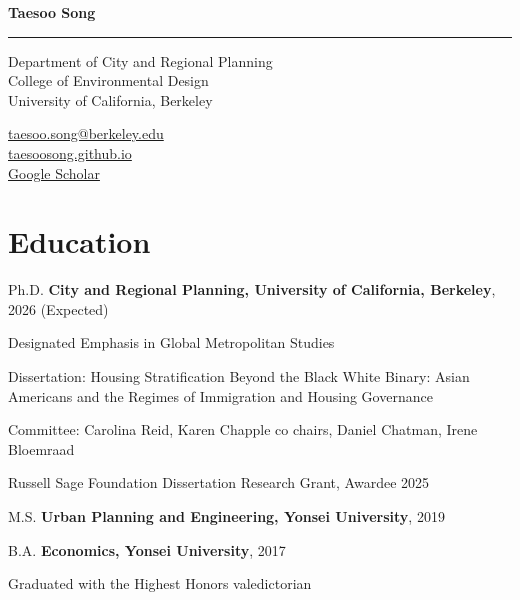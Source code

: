 \documentclass[11pt,letterpaper]{article}
\newcommand{\namefont}[1]{{\normalfont\bfseries\Huge #1}}
\begin{document}
\raggedright

\namefont{Taesoo Song}
\noindent\rule{\linewidth}{0.8pt}

\begin{minipage}[t]{0.66\textwidth}
Department of City and Regional Planning\\
College of Environmental Design\\
University of California, Berkeley
\end{minipage}
\begin{minipage}[t]{0.33\textwidth}
\raggedleft
\href{mailto:taesoo.song@berkeley.edu}{taesoo.song@berkeley.edu}\\
\href{https://taesoosong.github.io}{taesoosong.github.io}\\
\href{https://scholar.google.com/citations?user=xM5Rc-EAAAAJ}{Google Scholar}
\end{minipage}

\section{Education}
\begin{tablist}[itemsep=.45\baselineskip] %
  \item[Ph.D.] \tab{}\textbf{City and Regional Planning, University of California, Berkeley}, 2026 (Expected)
    \begin{subpoints}
      \item Designated Emphasis in Global Metropolitan Studies
    \end{subpoints}
    \begin{subpoints2}
      \item Dissertation: Housing Stratification Beyond the Black White Binary: Asian Americans and the Regimes of Immigration and Housing Governance
      \item Committee: Carolina Reid, Karen Chapple co chairs, Daniel Chatman, Irene Bloemraad
      \item Russell Sage Foundation Dissertation Research Grant, Awardee 2025
    \end{subpoints2}

  \item[M.S.] \tab{}\textbf{Urban Planning and Engineering, Yonsei University}, 2019

  \item[B.A.] \tab{}\textbf{Economics, Yonsei University}, 2017
    \begin{subpoints2}
      \item Graduated with the Highest Honors valedictorian
    \end{subpoints2}
\end{tablist}
\end{document}
